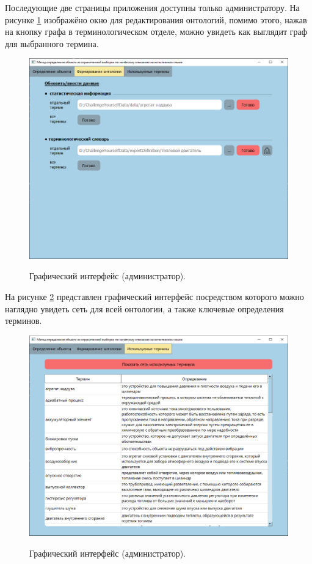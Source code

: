 Последующие две страницы приложения доступны только администратору. На рисунке \ref{fig41:image} изображёно окно для редактирования онтологий, помимо этого, нажав на кнопку графа в терминологическом отделе, можно увидеть как выглядит граф для выбранного термина.
\begin{figure}[h!]
	\begin{center}
		{\includegraphics[scale = 0.5]{img/ui/ui2.png}}
		\caption{Графический интерфейс (администратор).}
		\label{fig41:image}
	\end{center}
\end{figure}

\newpage

На рисунке \ref{fig42:image} представлен графический интерфейс посредством которого можно наглядно увидеть сеть для всей онтологии, а также ключевые определения терминов.
\begin{figure}[h]
	\begin{center}
		{\includegraphics[scale = 0.6]{img/ui/ui3.png}}
		\caption{Графический интерфейс (администратор).}
		\label{fig42:image}
	\end{center}
\end{figure}

